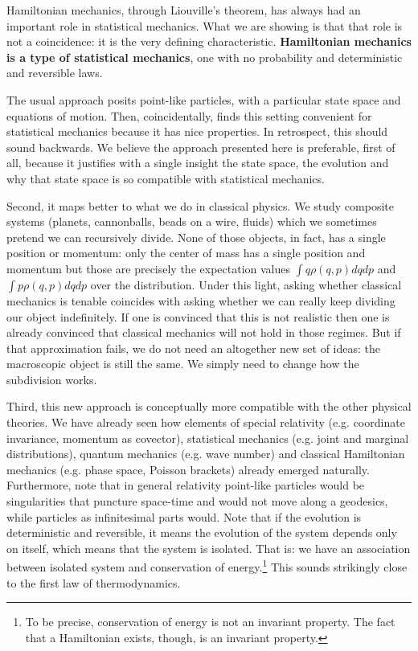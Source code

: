 \documentclass[11pt]{article}
\begin{document}
Hamiltonian mechanics, through Liouville's theorem, has always had an important role in statistical mechanics. What we are showing is that that role is not a coincidence: it is the very defining characteristic. \textbf{Hamiltonian mechanics is a type of statistical mechanics}, one with no probability and deterministic and reversible laws.

The usual approach posits point-like particles, with a particular state space and equations of motion. Then, coincidentally, finds this setting convenient for statistical mechanics because it has nice properties. In retrospect, this should sound backwards. We believe the approach presented here is preferable, first of all, because it justifies with a single insight the state space, the evolution and why that state space is so compatible with statistical mechanics.

Second, it maps better to what we do in classical physics. We study composite systems (planets, cannonballs, beads on a wire, fluids) which we sometimes pretend we can recursively divide. None of those objects, in fact, has a single position or momentum: only the center of mass has a single position and momentum but those are precisely the expectation values $\int q \rho(q,p) dq dp$ and $\int p \rho(q,p) dq dp$ over the distribution. Under this light, asking whether classical mechanics is tenable coincides with asking whether we can really keep dividing our object indefinitely. If one is convinced that this is not realistic then one is already convinced that classical mechanics will not hold in those regimes. But if that approximation fails, we do not need an altogether new set of ideas: the macroscopic object is still the same. We simply need to change how the subdivision works.

Third, this new approach is conceptually more compatible with the other physical theories. We have already seen how elements of special relativity (e.g. coordinate invariance, momentum as covector), statistical mechanics (e.g. joint and marginal distributions), quantum mechanics (e.g. wave number) and classical Hamiltonian mechanics (e.g. phase space, Poisson brackets) already emerged naturally. Furthermore, note that in general relativity point-like particles would be singularities that puncture space-time and would not move along a geodesics, while particles as infinitesimal parts would. Note that if the evolution is deterministic and reversible, it means the evolution of the system depends only on itself, which means that the system is isolated. That is: we have an association between isolated system and conservation of energy.\footnote{To be precise, conservation of energy is not an invariant property. The fact that a Hamiltonian exists, though, is an invariant property.} This sounds strikingly close to the first law of thermodynamics.
\end{document}
